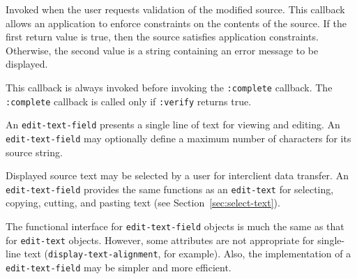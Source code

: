 \begin{flushright} \parbox[t]{6.125in}{ 
Invoked when the user requests validation of the modified source. 
This callback allows an application to enforce constraints on the contents of
the source. If the first return value is true, then the source satisfies
application constraints. Otherwise, the second value is a string containing an
error message to be displayed.

This callback
is always invoked before invoking the {\tt :complete} callback. The {\tt
:complete} callback is called only if 
{\tt :verify} returns true.
}\end{flushright}

%


\vfill
\pagebreak



An {\tt edit-text-field} presents a single line of text for viewing and editing.
An {\tt edit-text-field} may optionally define a maximum number of characters
for its source string.

Displayed source text may be selected by a user for interclient data transfer.
An {\tt edit-text-field} provides the same functions as an {\tt edit-text} for
selecting, copying, cutting, and pasting text (see
Section~\ref{sec:select-text}).

The functional interface for {\tt edit-text-field} objects is much the same as
that for {\tt edit-text} objects.  However, some attributes are not appropriate
for single-line text ({\tt display-text-alignment}, for example).  Also, the
implementation of a {\tt edit-text-field} may be simpler and more efficient.


